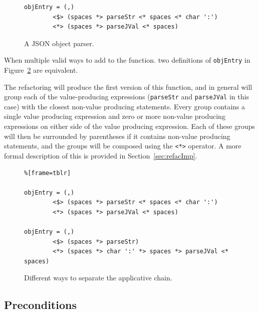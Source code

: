 \begin{figure}[t]
\begin{lstlisting}
objEntry = (,) 
        <$> (spaces *> parseStr <* spaces <* char ':') 
        <*> (spaces *> parseJVal <* spaces)
\end{lstlisting}
\caption{A JSON object parser.}
\label{objEntry}
\end{figure}

When \DIFdelbegin {}\DIFdelend \DIFaddbegin {}\texttt{\DIFadd{(*>)}} \texttt{\DIFadd{(<*)}} \DIFaddend multiple valid ways to add \DIFdelbegin {}\DIFdelend \DIFaddbegin {}\DIFaddend to the function. \DIFdelbegin {}\DIFdelend \DIFaddbegin {}\DIFaddend two definitions of \texttt{objEntry} in Figure~\ref{objEntry2} are equivalent.

The refactoring will produce the first version of this function, and in general will group each of the value-producing expressions (\texttt{parseStr} and \texttt{parseJVal} in this case) with the closest non-value producing statements. Every group contains a single value producing expression and zero or more non-value producing expressions on either side of the value producing expression. Each of these groups will then be surrounded by parentheses if it contains non-value producing statements, and the groups will be composed using the \texttt{<*>} operator. A more formal description of this is provided in Section~\ref{sec:refacImp}.


\begin{figure}[t]
\begin{lstlisting}%[frame=tblr]

objEntry = (,) 
        <$> (spaces *> parseStr <* spaces <* char ':') 
        <*> (spaces *> parseJVal <* spaces)

objEntry = (,) 
        <$> (spaces *> parseStr) 
        <*> (spaces *> char ':' *> spaces *> parseJVal <* spaces)
\end{lstlisting}
\caption{Different ways to separate the applicative chain.}
\label{objEntry2}
\end{figure}

\subsection{Preconditions}
\label{sec:appPrecons}

